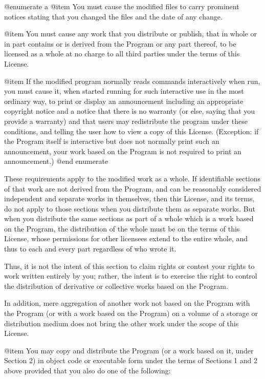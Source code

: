 @enumerate a
@item
You must cause the modified files to carry prominent notices
stating that you changed the files and the date of any change.

@item
You must cause any work that you distribute or publish, that in
whole or in part contains or is derived from the Program or any
part thereof, to be licensed as a whole at no charge to all third
parties under the terms of this License.

@item
If the modified program normally reads commands interactively
when run, you must cause it, when started running for such
interactive use in the most ordinary way, to print or display an
announcement including an appropriate copyright notice and a
notice that there is no warranty (or else, saying that you provide
a warranty) and that users may redistribute the program under
these conditions, and telling the user how to view a copy of this
License.  (Exception: if the Program itself is interactive but
does not normally print such an announcement, your work based on
the Program is not required to print an announcement.)
@end enumerate

These requirements apply to the modified work as a whole.  If
identifiable sections of that work are not derived from the Program,
and can be reasonably considered independent and separate works in
themselves, then this License, and its terms, do not apply to those
sections when you distribute them as separate works.  But when you
distribute the same sections as part of a whole which is a work based
on the Program, the distribution of the whole must be on the terms of
this License, whose permissions for other licensees extend to the
entire whole, and thus to each and every part regardless of who wrote it.

Thus, it is not the intent of this section to claim rights or contest
your rights to work written entirely by you; rather, the intent is to
exercise the right to control the distribution of derivative or
collective works based on the Program.

In addition, mere aggregation of another work not based on the Program
with the Program (or with a work based on the Program) on a volume of
a storage or distribution medium does not bring the other work under
the scope of this License.

@item
You may copy and distribute the Program (or a work based on it,
under Section 2) in object code or executable form under the terms of
Sections 1 and 2 above provided that you also do one of the following:

